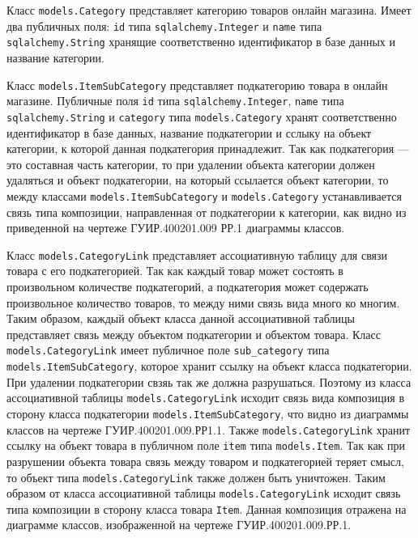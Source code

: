 Класс \texttt{models.Category} представляет категорию товаров онлайн магазина. Имеет два публичных поля: \texttt{id} типа \texttt{sqlalchemy.Integer} и \texttt{name} типа \texttt{sqlalchemy.String} хранящие соответственно идентификатор в базе данных и название категории.

Класс \texttt{models.ItemSubCategory} представляет подкатегорию товара в онлайн магазине. Публичные поля \texttt{id} типа \texttt{sqlalchemy.Integer}, \texttt{name} типа \texttt{sqlalchemy.String} и \texttt{category} типа \texttt{models.Category} хранят соответственно идентификатор в базе данных, название подкатегории и сслыку на объект категории, к которой данная подкатегория принадлежит. Так как подкатегория --- это составная часть категории, то при удалении объекта категории должен удаляться и объект подкатегории, на который ссылается объект категории, то между классами \texttt{models.ItemSubCategory} и \texttt{models.Category} устанавливается связь типа композиции, направленная от подкатегории к категории, как видно из приведенной на чертеже ГУИР.400201.009 РР.1 диаграммы классов.

Класс \texttt{models.CategoryLink} представляет ассоциативную таблицу для связи товара с его подкатегорией. Так как каждый товар может состоять в произвольном количестве подкатегорий, а подкатегория может содержать произвольное количество товаров, то между ними связь вида много ко многим. Таким образом, каждый объект класса данной ассоциативной таблицы представляет связь между объектом подкатегории и объектом товара. Класс \texttt{mo\-dels.CategoryLink} имеет публичное поле \texttt{sub\_category} типа \texttt{models.Item\-SubCategory}, которое хранит ссылку на объект класса подкатегории. При удалении подкатегории свзяь так же должна разрушаться. Поэтому из класса ассоциативной таблицы \texttt{models.CategoryLink} исходит связь вида композиция в сторону класса подкатегории \texttt{models.ItemSubCategory}, что видно из диаграммы классов на чертеже ГУИР.400201.009.РР1.1. Также \texttt{models.Cate\-goryLink} хранит ссылку на объект товара в публичном поле \texttt{item} типа \texttt{mo\-dels.Item}. Так как при разрушении объекта товара связь между товаром и подкатегорией теряет смысл, то объект типа \texttt{models.CategoryLink} также должен быть уничтожен. Таким образом от класса ассоциативной таблицы \texttt{mo\-dels.CategoryLink} исходит связь типа композиции в сторону класса товара \texttt{Item}. Данная композиция отражена на диаграмме классов, изображенной на чертеже ГУИР.400201.009.РР.1.

